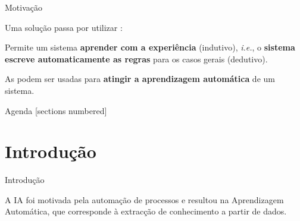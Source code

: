 \begin{frame}{Motivação \cont}


    \pauseskip

    Uma solução passa por utilizar :
    \begin{figure}
        \centering
        
    \end{figure}
    
    \pauseskip
    
    Permite um sistema \textbf{aprender com a experiência} (indutivo), \textit{i.e.}, o \textbf{sistema escreve automaticamente as regras} para os casos gerais (dedutivo).

    \pauseskip
   
    As  podem ser usadas para \textbf{atingir a aprendizagem automática} de um sistema. 
    
\end{frame}


\begin{frame}{Agenda}
  [sections numbered]
  \tableofcontents%
\end{frame}

\section{Introdução}

\begin{frame}{Introdução}

    
    \medskip

    \begin{figure}
			\centering
			\resizebox{!}{0.5\linewidth}{
				
			}
	\end{figure}

    \medskip

    A IA foi motivada pela automação de processos e resultou na Aprendizagem Automática, que corresponde à extracção de conhecimento a partir de dados.
	
\end{frame}

